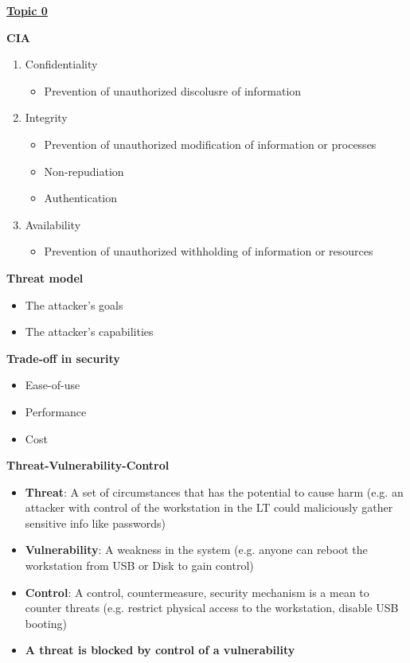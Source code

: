 \documentclass[landscape,a4paper]{extarticle}
\begin{document}
\fontsize{7}{7}\selectfont
{}\selectfont
\begin{multicols*}{5}
	\textbf{\uline{Topic 0}}

	\textbf{CIA}
	\begin{enumerate}
		\item Confidentiality
		      \begin{itemize}
			      \item Prevention of unauthorized discolusre of information
		      \end{itemize}
		\item Integrity
		      \begin{itemize}
			      \item Prevention of unauthorized modification of information or processes
			      \item Non-repudiation
			      \item Authentication
		      \end{itemize}
		\item Availability
		      \begin{itemize}
			      \item Prevention of unauthorized withholding of information or resources
		      \end{itemize}
	\end{enumerate}
	\textbf{Threat model}

	\begin{itemize}
		\item The attacker's goals
		\item The attacker's capabilities
	\end{itemize}

	\textbf{Trade-off in security}
	\begin{itemize}
		\item Ease-of-use
		\item Performance
		\item Cost
	\end{itemize}

	\textbf{Threat-Vulnerability-Control}
	\begin{itemize}
		\item \textbf{Threat}: A set of circumstances that has the potential to cause harm (e.g. an
        attacker with control of the workstation in the LT could maliciously gather
        sensitive info like passwords)
        \item \textbf{Vulnerability}: A weakness in the system (e.g. anyone can reboot the
        workstation from USB or Disk to gain control)
        \item \textbf{Control}: A control, countermeasure, security mechanism is a mean to counter threats
        (e.g. restrict physical access to the workstation, disable USB booting)
        \item \textbf{A threat is blocked by control of a vulnerability}
	\end{itemize}
    

\end{multicols*}
\end{document}
